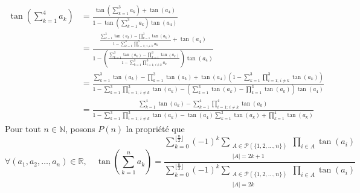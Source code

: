 \documentclass[10pt]{article}
\newcommand{\floor}[1]{\lfloor#1\rfloor}
\newcommand{\pr}[1]{\left(#1\right)}
\def\N{\mathbb N}
\def\R{\mathbb R}
\def\lb{\lbrace}
\def\rb{\rbrace}
\begin{document}
\begin{enumerate}
        \begin{align*}
            \tan\left(\sum_{k=1}^4a_k\right) &=\frac{\tan\left(\sum_{k=1}^3a_k\right)+\tan(a_4)}{1-\tan\left(\sum_{k=1}^3a_k\right)\tan(a_4)}\\
                          &=\frac{
                                \frac{
                                    \sum_{k=1}^3\tan(a_k)-\prod_{k=1}^3\tan(a_k)
                                    }
                                    {
                                    1-\sum_{k=1}^3\prod_{i=1;\ i\neq k}^3a_k
                                    }
                                    +\tan(a_4)
                                }
                                {
                                1-\left(
                                    \frac
                                    {
                                    \sum_{k=1}^3\tan(a_k)-\prod_{k=1}^3\tan(a_k)
                                    }
                                    {
                                    1-\sum_{k=1}^3\prod_{i=1;\ i\neq k}^3a_k
                                    }\right)\tan(a_4)
                                }\\
                          &=\frac{
                            \sum_{k=1}^3\tan(a_k)-\prod_{k=1}^3\tan(a_k)+\tan(a_4)\left(1-\sum_{k=1}^3\prod_{i=1;\ i\neq k}^3\tan(a_k)\right)
                          }
                          {
                            1-\sum_{k=1}^3\prod_{i=1;\ i\neq k}^3\tan(a_k)-\left(\sum_{k=1}^3\tan(a_k)-\prod_{k=1}^3\tan(a_k)\right)\tan(a_4)
                          }\\
                          &=\frac{
                            \sum_{k=1}^4\tan(a_k)-\sum_{k=1}^4\prod_{i=1;\ i\neq k}^4\tan(a_k)
                          }
                          {
                            1-\sum_{k=1}^3\prod_{i=1;\ i\neq k}^3\tan(a_k)-\tan(a_4)\sum_{k=1}^3\tan(a_k)+\prod_{k=1}^4\tan(a_k)
                          }
        \end{align*}
        Pour tout $n\in\N$, posons $P(n)$ la propriété que \[\forall (a_1,a_2,\dots,a_n)\in\R,\quad \tan\pr{\sum_{k=1}^na_k}=\frac{\displaystyle\sum_{k=0}^{\floor{\frac n2}}(-1)^k\displaystyle\sum_{\begin{smallmatrix}A\in\mathcal{P}(\lb1,2,\dots,n\rb)\\ |A|=2k+1\end{smallmatrix}}\displaystyle\prod_{i\in A}\tan(a_i)}{\displaystyle\sum_{k=0}^{\floor{\frac n2}}(-1)^k\displaystyle\sum_{\begin{smallmatrix}A\in\mathcal{P}(\lb1,2,\dots,n\rb)\\ |A|=2k\end{smallmatrix}}\prod_{i\in A}\tan(a_i)}\]
    \end{enumerate}
\end{document}
